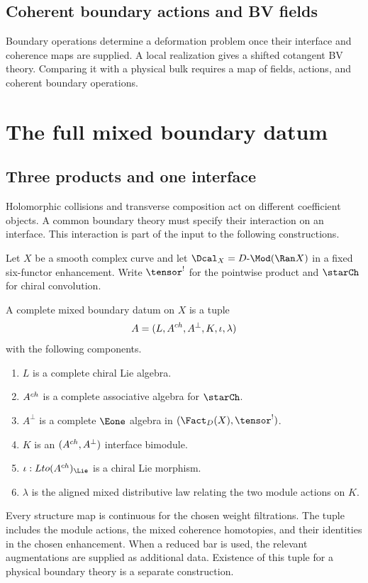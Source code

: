 \cleardoublepage
{}
{}
\chapter*{Coherent boundary actions and BV fields}
\begin{summarybox}
Boundary operations determine a deformation problem once their interface and coherence maps are supplied. A local realization gives a shifted cotangent BV theory. Comparing it with a physical bulk requires a map of fields, actions, and coherent boundary operations.
\end{summarybox}
\part{The full mixed boundary datum}

\chapter{Three products and one interface}
Holomorphic collisions and transverse composition act on different coefficient objects. A common boundary theory must specify their interaction on an interface. This interaction is part of the input to the following constructions.

Let $X$ be a smooth complex curve and let $\Dcal_X=D\text{-}\Mod(\Ran X)$ in a fixed six-functor enhancement.  Write $\tensor^!$ for the pointwise product and $\starCh$ for chiral convolution.

\begin{definition}
A complete mixed boundary datum on $X$ is a tuple
\[
 A=(L,A^{ch},A^\perp,K,\iota,\lambda)
\]
with the following components.
\begin{enumerate}
\item $L$ is a complete chiral Lie algebra.
\item $A^{ch}$ is a complete associative algebra for $\starCh$.
\item $A^\perp$ is a complete $\Eone$ algebra in $(\Fact_D(X),\tensor^!)$.
\item $K$ is an $(A^{ch},A^\perp)$ interface bimodule.
\item $\iota:L\to(A^{\ch})_{\Lie}$ is a chiral Lie morphism.
\item $\lambda$ is the aligned mixed distributive law relating the two module actions on $K$.
\end{enumerate}
Every structure map is continuous for the chosen weight filtrations. The tuple includes the module actions, the mixed coherence homotopies, and their identities in the chosen enhancement. When a reduced bar is used, the relevant augmentations are supplied as additional data. Existence of this tuple for a physical boundary theory is a separate construction.
\end{definition}

